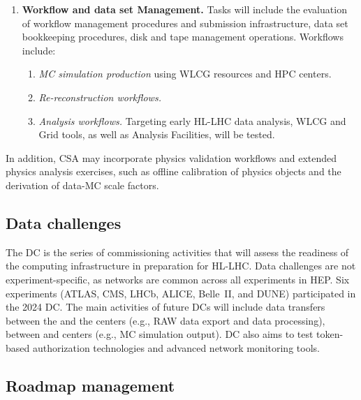 \begin{enumerate}
\begin{enumerate}
    \end{enumerate}
    \item \textbf{Workflow and data set Management.} Tasks will include the evaluation of workflow management procedures and submission infrastructure, data set bookkeeping procedures, disk and tape management operations. Workflows include:
    \begin{enumerate}
        \item \textit{\gls{MC} simulation production} using \gls{WLCG} resources and \gls{HPC} centers.
        \item \textit{Re-reconstruction workflows.}
        \item \textit{Analysis workflows.} Targeting early \gls{HL-LHC} data analysis, \gls{WLCG} and \gls{Grid} tools, as well as Analysis Facilities, will be tested.
    \end{enumerate}
\end{enumerate}

In addition, \gls{CSA} may incorporate physics validation workflows and extended physics analysis exercises, such as offline calibration of physics objects and the derivation of data-\gls{MC} scale factors.

\subsection{Data challenges}

The \gls{DC} is the series of commissioning activities that will assess the readiness of the computing infrastructure in preparation for \gls{HL-LHC}. Data challenges are not experiment-specific, as networks are common across all experiments in \gls{HEP}. Six experiments (ATLAS, CMS, LHCb, ALICE, Belle~II, and DUNE) participated in the 2024 DC.
The main activities of future DCs will include data transfers between the \TierZero and the \TierOne centers (e.g., \gls{RAW} data export and data processing), between \TierOne and \TierTwo centers (e.g., \gls{MC} simulation output). \gls{DC} also aims to test token-based authorization technologies and advanced network monitoring tools.

\subsection{Roadmap management}


